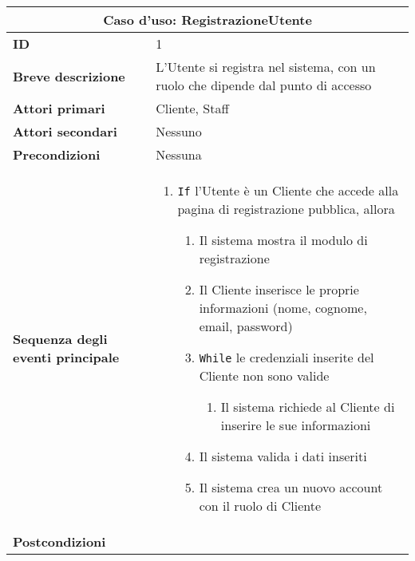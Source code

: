 \documentclass[a4paper]{report}
\begin{document}
\clearpage
\begin{table}[H]
\vspace*{-0cm}
\renewcommand{\arraystretch}{1.9}
\begin{tabular}{|p{3.9cm}|p{9.9cm}|}
\hline
\multicolumn{2}{|c|}{\textbf{Caso d’uso: RegistrazioneUtente}} \\ \hline
\textbf{ID} & 1 \\ \hline
\textbf{Breve descrizione} & L'Utente si registra nel sistema, con un ruolo che dipende dal punto di accesso \\ \hline
\textbf{Attori primari} & Cliente, Staff \\ \hline
\textbf{Attori secondari} & Nessuno \\ \hline
\textbf{Precondizioni} & Nessuna \\ \hline
\textbf{Sequenza degli eventi principale} &
\begin{enumerate}[leftmargin=14pt,label=\arabic*.,labelsep=0.5em,topsep=0pt,partopsep=0pt,parsep=0pt,itemsep=0pt]
    \item \texttt{If} l'Utente è un Cliente che accede alla pagina di registrazione pubblica, allora
    \begin{enumerate}[label=\arabic{enumi}.\arabic*.,leftmargin=22pt,labelsep=0.5em,topsep=0pt,partopsep=0pt,parsep=0pt,itemsep=0pt]
        \item Il sistema mostra il modulo di registrazione
        \item Il Cliente inserisce le proprie informazioni (nome, cognome, email, password)
        \item \texttt{While} le credenziali inserite del Cliente non sono valide
        \begin{enumerate}[label=\arabic{enumi}.\arabic*.,leftmargin=22pt,labelsep=0.5em,topsep=0pt,partopsep=0pt,parsep=0pt,itemsep=0pt]
        \item Il sistema richiede al Cliente di inserire le sue informazioni
    \end{enumerate}
        \item Il sistema valida i dati inseriti
        \item Il sistema crea un nuovo account con il ruolo di Cliente
    \end{enumerate}
\end{enumerate}\\ \hline
\textbf{Postcondizioni} & 
\begin{enumerate}[leftmargin=14pt,label=\arabic*.,labelsep=0.5em,topsep=0pt,partopsep=0pt,parsep=0pt,itemsep=0pt]

\end{enumerate}
\end{tabular}
\end{table}
\end{document}
